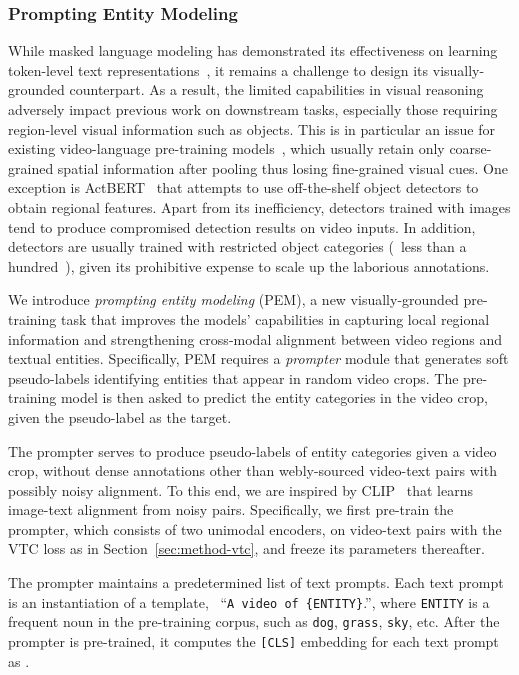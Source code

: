 \documentclass[10pt,twocolumn,letterpaper]{article}
\begin{document}
\subsubsection{Prompting Entity Modeling}\label{sec:method-obj}
While masked language modeling has demonstrated its effectiveness on learning token-level text representations~\cite{devlin2018bert,liu2019roberta}, it remains a challenge to design its visually-grounded counterpart.
As a result, the limited capabilities in visual reasoning adversely impact previous work on downstream tasks, especially those requiring region-level visual information such as objects.
This is in particular an issue for existing video-language pre-training models~\cite{miech2019howto100m,miech2019howto100m,miech2020end,sun2019videobert,li2020hero}, which usually retain only coarse-grained spatial information after pooling thus losing fine-grained visual cues.
One exception is ActBERT~\cite{zhu2020actbert} that attempts to use off-the-shelf object detectors to obtain regional features.
Apart from its inefficiency, detectors trained with images tend to produce compromised detection results on video inputs.
In addition, detectors are usually trained with restricted object categories (\eg~less than a hundred~\cite{lin2014microsoft}), given its prohibitive expense to scale up the laborious annotations.

We introduce \emph{prompting entity modeling} (PEM), a new visually-grounded pre-training task that improves the models' capabilities in capturing local regional information and strengthening cross-modal alignment between video regions and textual entities.
Specifically, PEM requires a \emph{prompter} module that generates soft pseudo-labels identifying entities that appear in random video crops.
The pre-training model is then asked to predict the entity categories in the video crop, given the pseudo-label as the target.

The prompter serves to produce pseudo-labels of entity categories given a video crop,
without dense annotations other than webly-sourced video-text pairs with possibly noisy alignment.
To this end, we are inspired by CLIP~\cite{radford2learning} that learns image-text alignment from noisy pairs.
Specifically, we first pre-train the prompter, which consists of two unimodal encoders, on video-text pairs with the VTC loss as in Section~\ref{sec:method-vtc}, and freeze its parameters thereafter.

The prompter maintains a predetermined list of  text prompts.
Each text prompt is an instantiation of a template, \eg~``\texttt{A video of \{ENTITY\}}.'', where \texttt{ENTITY} is a frequent noun in the pre-training corpus, such as \texttt{dog}, \texttt{grass}, \texttt{sky}, etc.
After the prompter is pre-trained, it computes the \texttt{[CLS]} embedding for each text prompt as .
\end{document}
